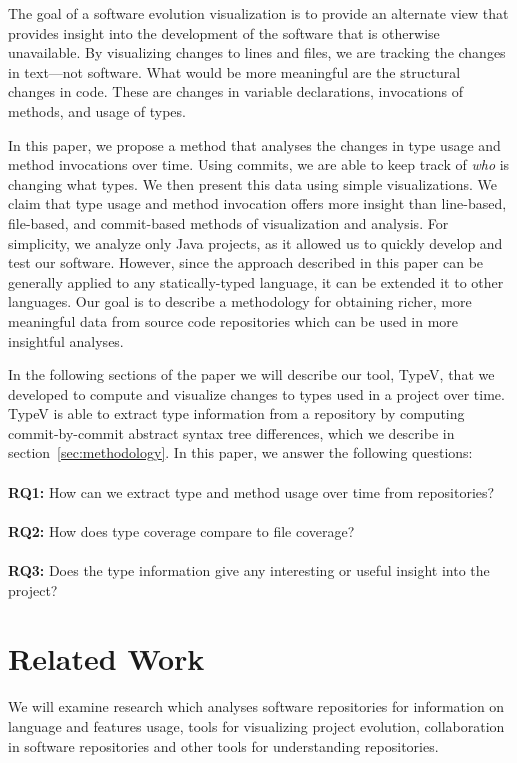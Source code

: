 The goal of a software evolution visualization is to provide an alternate view that provides insight into the development of the software that is otherwise unavailable. By visualizing changes to lines and files, we are tracking the changes in text---not software. What would be more meaningful are the structural changes in code. These are changes in variable declarations, invocations of methods, and usage of types.

In this paper, we propose a method that analyses the changes in type usage and method invocations over time. Using commits, we are able to keep track of \emph{who} is changing what types. We then present this data using simple visualizations. We claim that type usage and method invocation offers more insight than line-based, file-based, and commit-based methods of visualization and analysis. For simplicity, we analyze only Java projects, as it allowed us to quickly develop and test our software. However, since the approach described in this paper can be generally applied to any statically-typed language, it can be extended it to other languages. Our goal is to describe a methodology for obtaining richer, more meaningful data from source code repositories which can be used in more insightful analyses.

In the following sections of the paper we will describe our tool, TypeV, that we developed to compute and visualize changes to types used in a project over time. TypeV is able to extract type information from a repository by computing commit-by-commit abstract syntax tree differences, which we describe in section~\ref{sec:methodology}. In this paper, we answer the following questions: \\ \\
\textbf{RQ1:} How can we extract type and method usage over time from repositories? \\ \\
\textbf{RQ2:} How does type coverage compare to file coverage?
\\ \\
\textbf{RQ3:} Does the type information give any interesting or useful insight into the project? 

\section{Related Work}

We will examine research which analyses software repositories for information on language and features usage, tools for visualizing project evolution, collaboration in software repositories and other tools for understanding repositories.

